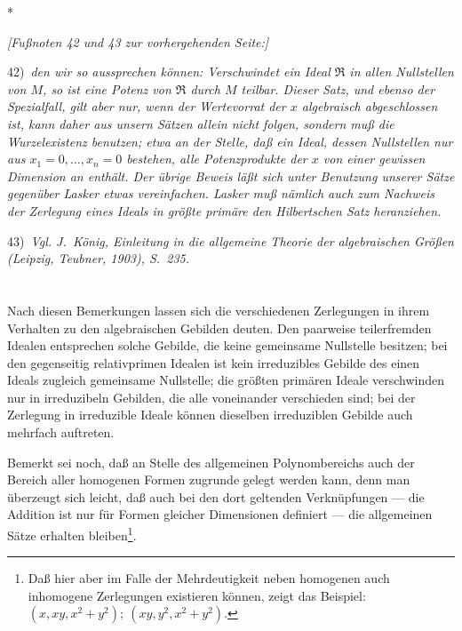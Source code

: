 \documentclass[fontsize=10pt,paper=a5,pagesize,headings=small]{scrbook}
\newcommand{\ideal}[1]{\mathfrak{#1}}
\theoremstyle{plain}
\begin{document}
\begin{center} * \quad * \quad * \end{center}

\textit{[Fußnoten 42 und 43 zur vorhergehenden Seite:]}

42) \,\textit{den wir so aussprechen können: Verschwindet ein Ideal $\ideal{R}$ in allen
Nullstellen von $M$, so ist eine Potenz von $\ideal{R}$ durch $M$ teilbar. Dieser
Satz, und ebenso der Spezialfall, gilt aber nur, wenn der Wertevorrat der
$x$ algebraisch abgeschlossen ist, kann daher aus unsern Sätzen allein nicht
folgen, sondern muß die Wurzelexistenz benutzen; etwa an der Stelle, daß
ein Ideal, dessen Nullstellen nur aus $x_1 = 0,\dots,x_n = 0$ bestehen, alle
Potenzprodukte der $x$ von einer gewissen Dimension an enthält. Der übrige
Beweis läßt sich unter Benutzung unserer Sätze gegenüber Lasker etwas
vereinfachen. Lasker muß nämlich auch zum Nachweis der Zerlegung eines
Ideals in größte primäre den Hilbertschen Satz heranziehen.}

43) \,\textit{Vgl. J.~König, Einleitung in die allgemeine Theorie der algebraischen
Größen (Leipzig, Teubner, 1903), S.~235.}

\setcounter{page}{403}
\section*{}

Nach diesen Bemerkungen lassen sich die verschiedenen Zerlegungen in
ihrem Verhalten zu den algebraischen Gebilden deuten. Den paarweise
teilerfremden Idealen entsprechen solche Gebilde, die keine gemeinsame
Nullstelle besitzen; bei den gegenseitig relativprimen Idealen ist kein
irreduzibles Gebilde des einen Ideals zugleich gemeinsame Nullstelle; die
größten primären Ideale verschwinden nur in irreduzibeln Gebilden, die alle
voneinander verschieden sind; bei der Zerlegung in irreduzible Ideale können
dieselben irreduziblen Gebilde auch mehrfach auftreten.

Bemerkt sei noch, daß an Stelle des allgemeinen Polynombereichs auch der
Bereich aller homogenen Formen zugrunde gelegt werden kann, denn man
überzeugt sich leicht, daß auch bei den dort geltenden Verknüpfungen --- die
Addition ist nur für Formen gleicher Dimensionen definiert --- die allgemeinen
Sätze erhalten bleiben\footnote{Daß hier aber im Falle der Mehrdeutigkeit neben
homogenen auch inhomogene Zerlegungen existieren können, zeigt das Beispiel:
$(x, xy, x^2+y^2);\ (xy, y^2, x^2+y^2)$.}.
\end{document}
